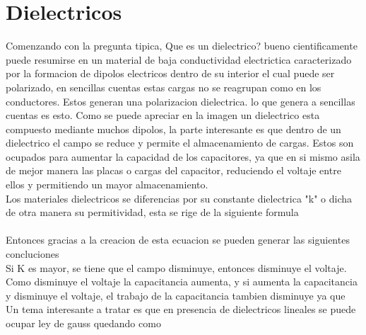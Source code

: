 \section{Dielectricos}
Comenzando con la pregunta tipica, Que es un dielectrico? bueno cientificamente puede resumirse en un material de baja conductividad electrictica caracterizado por la formacion de dipolos electricos dentro de su interior el cual puede ser polarizado, en sencillas cuentas estas cargas no se reagrupan como en los conductores. Estos generan una polarizacion dielectrica. lo que genera a sencillas cuentas es esto.
Como se puede apreciar en la imagen un dielectrico esta compuesto mediante muchos dipolos, la parte interesante es que dentro de un dielectrico el campo se reduce y permite el almacenamiento de cargas. Estos son ocupados para aumentar la capacidad de los capacitores, ya que en si mismo asila de mejor manera las placas o cargas del capacitor, reduciendo el voltaje entre ellos y permitiendo un mayor almacenamiento.\\
Los materiales dielectricos se diferencias por su constante dielectrica "k" o dicha de otra manera su permitividad, esta se rige de la siguiente formula
\\
\\
Entonces gracias a la creacion de esta ecuacion se pueden generar las siguientes concluciones
\\
Si K es mayor, se tiene que el campo disminuye, entonces disminuye el voltaje. Como disminuye el voltaje la capacitancia aumenta, y si aumenta la capacitancia y disminuye el voltaje, el trabajo de la capacitancia tambien disminuye ya que
\\
Un tema interesante a tratar es que en presencia de dielectricos lineales se puede ocupar ley de gauss quedando como
